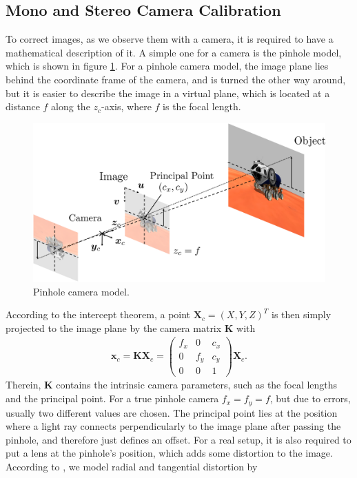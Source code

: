 \subsection{Mono and Stereo Camera Calibration}
To correct images, as we observe them with a camera, it is required to have a mathematical description of it. A simple one for a camera is the pinhole model, which is shown in figure \ref{fig::224_pin_hole_camera}. For a pinhole camera model, the image plane lies behind the coordinate frame of the camera, and is turned the other way around, but it is easier to describe the image in a virtual plane, which is located at a distance $f$ along the $z_c$-axis, where $f$ is the focal length.
\begin{figure}[h!]
	\centering
	\includegraphics[scale=.28]{chapters/03_principles_of_machine_learning/img/pin_hole_camera.png}
	\caption{Pinhole camera model.}
	\label{fig::224_pin_hole_camera}
\end{figure}
According to the intercept theorem, a point $\bm{X}_c = (X,Y,Z)^T$ is then simply projected to the image plane by the camera matrix $\bm{K}$ with
\begin{align}
	\bm{x}_c = \bm{K}\bm{X}_c = \begin{pmatrix}
	f_x & 0   & c_x \\
	0   & f_y & c_y \\
	0   & 0   & 1
	\end{pmatrix}\bm{X}_c.
	\label{eq::224_focal_intrinsics}
\end{align}
Therein, $\bm{K}$ contains the intrinsic camera parameters, such as the focal lengths and the principal point. For a true pinhole camera $f_x = f_y =f$, but due to errors, usually two different values are chosen. The principal point lies at the position where a light ray connects perpendicularly to the image plane after passing the pinhole, and therefore just defines an offset. For a real setup, it is also required to put a lens at the pinhole's position, which adds some distortion to the image. According to \cite{duane1971close}, we model radial and tangential distortion by
